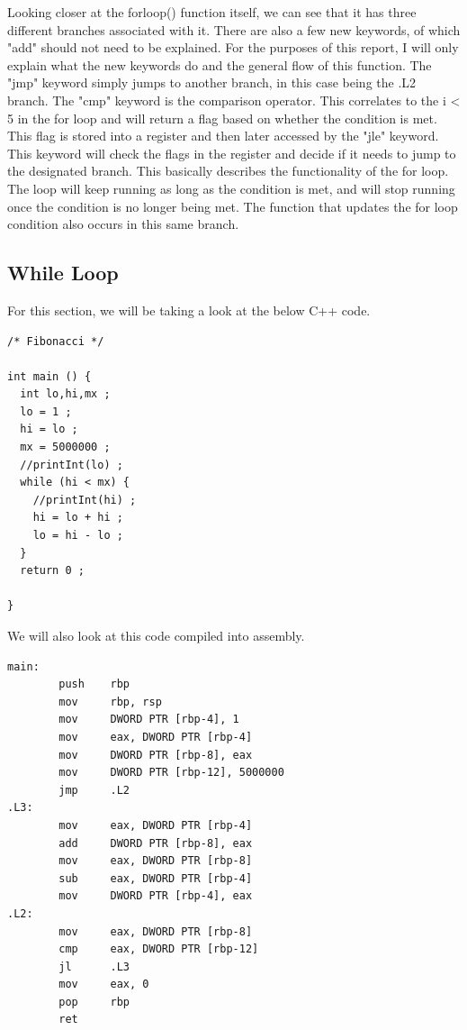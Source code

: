 \documentclass{article}
\theoremstyle{theorem}
\theoremstyle{definition}
\theoremstyle{remark}
\begin{document}
Looking closer at the forloop() function itself, we can see that it has three different branches associated with it. There are also a few new keywords, of which "add" should not need to be explained. For the purposes of this report, I will only explain what the new keywords do and the general flow of this function. The "jmp" keyword simply jumps to another branch, in this case being the .L2 branch. The "cmp" keyword is the comparison operator. This correlates to the i < 5 in the for loop and will return a flag based on whether the condition is met. This flag is stored into a register and then later accessed by the "jle" keyword. This keyword will check the flags in the register and decide if it needs to jump to the designated branch. This basically describes the functionality of the for loop. The loop will keep running as long as the condition is met, and will stop running once the condition is no longer being met. The function that updates the for loop condition also occurs in this same branch.

\subsection{While Loop}

For this section, we will be taking a look at the below C++ code.

\begin{lstlisting}
/* Fibonacci */

int main () {
  int lo,hi,mx ;
  lo = 1 ;
  hi = lo ;
  mx = 5000000 ;
  //printInt(lo) ;
  while (hi < mx) {
    //printInt(hi) ;
    hi = lo + hi ;
    lo = hi - lo ;
  }
  return 0 ;

}
\end{lstlisting}

We will also look at this code compiled into assembly.

\begin{lstlisting}
main:
        push    rbp
        mov     rbp, rsp
        mov     DWORD PTR [rbp-4], 1
        mov     eax, DWORD PTR [rbp-4]
        mov     DWORD PTR [rbp-8], eax
        mov     DWORD PTR [rbp-12], 5000000
        jmp     .L2
.L3:
        mov     eax, DWORD PTR [rbp-4]
        add     DWORD PTR [rbp-8], eax
        mov     eax, DWORD PTR [rbp-8]
        sub     eax, DWORD PTR [rbp-4]
        mov     DWORD PTR [rbp-4], eax
.L2:
        mov     eax, DWORD PTR [rbp-8]
        cmp     eax, DWORD PTR [rbp-12]
        jl      .L3
        mov     eax, 0
        pop     rbp
        ret
\end{lstlisting}
\end{document}

